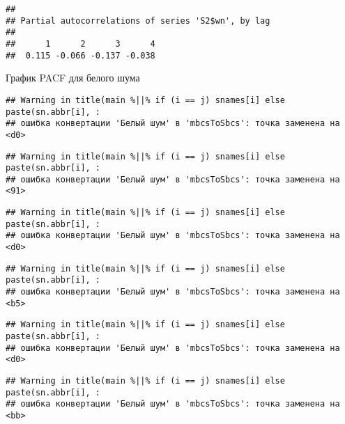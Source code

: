 \documentclass[
]{article}
\newenvironment{Shaded}{\begin{snugshade}}{\end{snugshade}}
\newcommand{\AttributeTok}[1]{\textcolor[rgb]{0.13,0.29,0.53}{#1}}
\newcommand{\DecValTok}[1]{\textcolor[rgb]{0.00,0.00,0.81}{#1}}
\newcommand{\FunctionTok}[1]{\textcolor[rgb]{0.13,0.29,0.53}{\textbf{#1}}}
\newcommand{\NormalTok}[1]{#1}
\newcommand{\SpecialCharTok}[1]{\textcolor[rgb]{0.81,0.36,0.00}{\textbf{#1}}}
\newcommand{\StringTok}[1]{\textcolor[rgb]{0.31,0.60,0.02}{#1}}
\begin{document}
\begin{verbatim}
## 
## Partial autocorrelations of series 'S2$wn', by lag
## 
##      1      2      3      4 
##  0.115 -0.066 -0.137 -0.038
\end{verbatim}

График PACF для белого шума

\begin{Shaded}
\end{Shaded}

\begin{verbatim}
## Warning in title(main %||% if (i == j) snames[i] else paste(sn.abbr[i], :
## ошибка конвертации 'Белый шум' в 'mbcsToSbcs': точка заменена на <d0>
\end{verbatim}

\begin{verbatim}
## Warning in title(main %||% if (i == j) snames[i] else paste(sn.abbr[i], :
## ошибка конвертации 'Белый шум' в 'mbcsToSbcs': точка заменена на <91>
\end{verbatim}

\begin{verbatim}
## Warning in title(main %||% if (i == j) snames[i] else paste(sn.abbr[i], :
## ошибка конвертации 'Белый шум' в 'mbcsToSbcs': точка заменена на <d0>
\end{verbatim}

\begin{verbatim}
## Warning in title(main %||% if (i == j) snames[i] else paste(sn.abbr[i], :
## ошибка конвертации 'Белый шум' в 'mbcsToSbcs': точка заменена на <b5>
\end{verbatim}

\begin{verbatim}
## Warning in title(main %||% if (i == j) snames[i] else paste(sn.abbr[i], :
## ошибка конвертации 'Белый шум' в 'mbcsToSbcs': точка заменена на <d0>
\end{verbatim}

\begin{verbatim}
## Warning in title(main %||% if (i == j) snames[i] else paste(sn.abbr[i], :
## ошибка конвертации 'Белый шум' в 'mbcsToSbcs': точка заменена на <bb>
\end{verbatim}
\end{document}
